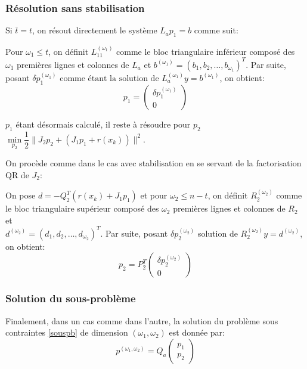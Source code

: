 \documentclass[a4paper,11pt]{article}
\numberwithin{equation}{section}
\begin{document}
\subsubsection{Résolution sans stabilisation} \label{resolutionsstab}


Si $\bar{t}=t$, on résout directement le système $L_{a}p_{1}=b$ comme suit:

Pour $\omega_{1} \leq t$, on définit $L_{11}^{(\omega_{1})}$ comme le bloc triangulaire inférieur composé des $\omega_{1}$ premières lignes et colonnes de $L_{a}$ et $b^{(\omega_{1})}= (b_1, b_2, \ldots, b_{\omega_{1}})^T$. Par suite, posant $\delta p_1^{(\omega_{1})} \text{ comme étant la solution de } L_{a}^{(\omega_{1})}y = b^{(\omega_{1})}$, on obtient:
\begin{equation} \label{calculp1}
p_1 = \begin{pmatrix} \delta p_1^{(\omega_{1})} \\ 0 \end{pmatrix}
\end{equation}

$p_1$ étant désormais calculé, il reste à résoudre pour $p_2$ $\underset{p_2}{\min} \dfrac{1}{2}\|J_2p_2 + (J_1p_1 + r(x_{k}))\|^2$. 

On procède comme dans le cas avec stabilisation en se servant de la factorisation QR de $J_2$:


On pose $d = -Q_2^T(r(x_{k}) + J_1p_1)$ et pour $\omega_{2} \leq n-t$, on définit $R_{2}^{(\omega_{2} )}$ comme le bloc triangulaire supérieur composé des $\omega_{2}$ premières lignes et colonnes de $R_{2}$ et \\ $d^{(\omega_{2})} = (d_1, d_2, \ldots, d_{\omega_{2}})^T$.
Par suite, posant $\delta p_2^{(\omega_{2})}$ solution de $R_{2}^{(\omega_{2})}y =d^{(\omega_{2})}$, on obtient:
\begin{equation} \label{calculp2}
p_2 = P_2^T\begin{pmatrix} \delta p_2^{(\omega_{2})} \\ 0 \end{pmatrix}
\end{equation}

\subsubsection{Solution du sous-problème}
Finalement, dans un cas comme dans l'autre, la solution du problème sous contraintes \ref{souspb} de dimension $(\omega_{1}, \omega_{2})$ est donnée par: 
\begin{equation}
{p^{(\omega_{1},\omega_{2})} = Q_{a} \begin{pmatrix} p_1 \\ p_2 \end{pmatrix}}
\end{equation}
\end{document}
